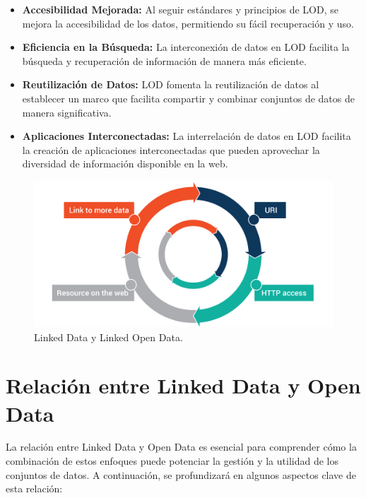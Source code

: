 \documentclass[11pt]{report}
\begin{document}
		\begin{itemize}
		\item \textbf{Accesibilidad Mejorada:} Al seguir estándares y principios de LOD, se mejora la accesibilidad de los datos, permitiendo su fácil recuperación y uso.
		
		\item \textbf{Eficiencia en la Búsqueda:} La interconexión de datos en LOD facilita la búsqueda y recuperación de información de manera más eficiente.
		
		\item \textbf{Reutilización de Datos:} LOD fomenta la reutilización de datos al establecer un marco que facilita compartir y combinar conjuntos de datos de manera significativa.
		
		\item \textbf{Aplicaciones Interconectadas:} La interrelación de datos en LOD facilita la creación de aplicaciones interconectadas que pueden aprovechar la diversidad de información disponible en la web.
		\end{itemize}

		\begin{figure}[H]
			\centering
			\includegraphics[scale=0.2]{../img/What-are-Linked-Data-and-Linked-Open-Data.png}
			\caption{Linked Data y Linked Open Data.}
			\label{fig:LOD}
		\end{figure}


	\chapter{Relación entre Linked Data y Open Data}

		La relación entre Linked Data y Open Data es esencial para comprender cómo la combinación de estos enfoques puede potenciar la gestión y la utilidad de los conjuntos de datos. A continuación, se profundizará en algunos aspectos clave de esta relación:
		
\end{document}
